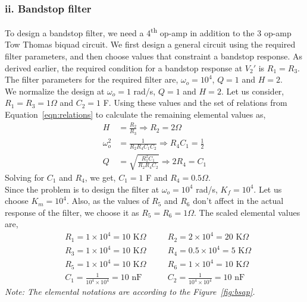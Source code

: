 \documentclass{lab_sheet}
\begin{document}
\subsubsection*{ii. Bandstop filter}
To design a bandstop filter, we need a 4\textsuperscript{th} op-amp in addition to the 3 op-amp Tow Thomas biquad circuit. We first design a general circuit using the required filter parameters, and then choose values that constraint a bandstop response. As derived earlier, the required condition for a bandstop response at $V_2'$ is $R_1=R_3$.\\
The filter parameters for the required filter are, $\omega_o=10^4$, $Q=1$ and $H=2$.\\
We normalize the design at $\omega_o=1$ rad/s, $Q=1$ and $H=2$. Let us consider, $R_1=R_3=1\Omega$ and $C_2=1$ F. Using these values and the set of relations from Equation~\ref{eqn:relations} to calculate the remaining elemental values as,
\begin{equation*}
    \begin{aligned}
        H&=\frac{R_2}{R_3}\Rightarrow R_2=2\Omega\\
       \omega_o^2&=\frac{1}{R_2R_4C_1C_2}\Rightarrow R_4C_1=\frac{1}{2}\\
       Q&=\sqrt{\frac{R_1^2C_1}{R_2R_4C_2}}\Rightarrow 2R_4=C_1
    \end{aligned}
\end{equation*}
Solving for $C_1$ and $R_4$, we get, $C_1=1$ F and  $R_4=0.5\Omega$.\\
Since the problem is to design the filter at $\omega_o=10^4$ rad/s, $K_f=10^4$. Let us choose $K_m=10^4$. Also, as the values of $R_5$ and $R_6$ don't affect in the actual response of the filter, we choose it as $R_5=R_6=1\Omega$. The scaled elemental values are,
 \begin{equation*}
    \begin{aligned}
       &R_1=1\times10^4=10 \text{ K}\Omega \quad &&R_2=2\times10^4=20 \text{ K}\Omega\\
       &R_3=1\times10^4=10 \text{ K}\Omega \quad &&R_4=0.5\times10^4=5 \text{ K}\Omega\\
       &R_5=1\times10^4=10 \text{ K}\Omega \quad &&R_6=1\times10^4=10 \text{ K}\Omega\\
       &C_1= \frac{1}{10^4\times10^4}=10\text{ nF} \quad && 
       C_2= \frac{1}{10^4\times10^4}=10\text{ nF}
    \end{aligned}
\end{equation*}
\textit{Note: The elemental notations are according to the Figure~\ref{fig:bsap}.}
\end{document}
